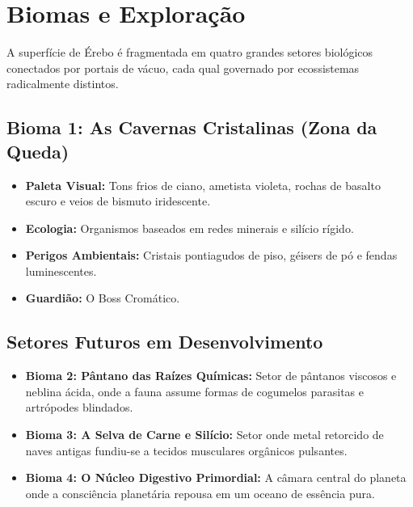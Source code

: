 \documentclass[a4paper,12pt]{report}
\begin{document}
\chapter{Biomas e Exploração}

A superfície de Érebo é fragmentada em quatro grandes setores biológicos conectados por portais de vácuo, cada qual governado por ecossistemas radicalmente distintos.

\section{Bioma 1: As Cavernas Cristalinas (Zona da Queda)}
\begin{itemize}
    \item \textbf{Paleta Visual:} Tons frios de ciano, ametista violeta, rochas de basalto escuro e veios de bismuto iridescente.
    \item \textbf{Ecologia:} Organismos baseados em redes minerais e silício rígido.
    \item \textbf{Perigos Ambientais:} Cristais pontiagudos de piso, géisers de pó e fendas luminescentes.
    \item \textbf{Guardião:} O Boss Cromático.
\end{itemize}

\section{Setores Futuros em Desenvolvimento}
\begin{itemize}
    \item \textbf{Bioma 2: Pântano das Raízes Químicas:} Setor de pântanos viscosos e neblina ácida, onde a fauna assume formas de cogumelos parasitas e artrópodes blindados.
    \item \textbf{Bioma 3: A Selva de Carne e Silício:} Setor onde metal retorcido de naves antigas fundiu-se a tecidos musculares orgânicos pulsantes.
    \item \textbf{Bioma 4: O Núcleo Digestivo Primordial:} A câmara central do planeta onde a consciência planetária repousa em um oceano de essência pura.
\end{itemize}

\end{document}
